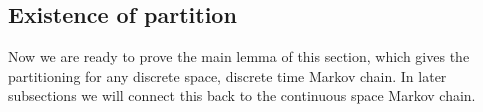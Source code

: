 
\subsection{Existence of partition}
\label{subsec:main}

Now we are ready to prove the main lemma of this section, which gives the partitioning for any discrete space, discrete time Markov chain. In later subsections we will connect this back to the continuous space Markov chain.

